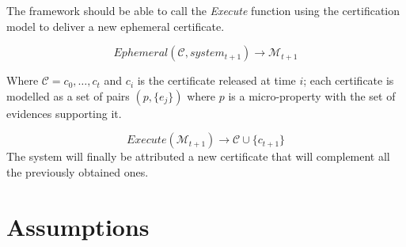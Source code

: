 The framework should be able to call the \textit{Execute} function using the certification model to deliver a new ephemeral certificate.

\[Ephemeral(\mathcal{C}, system_{t+1}) \rightarrow {\mathcal{M}}_{t+1} \]

Where \( \mathcal{C} = {c_0, \dots , c_t} \) and \(c_i\) is the certificate released at time \(i\); each certificate is modelled as a set of pairs \( (p, \{e_j\}) \) where \(p\) is a micro-property with the set of evidences supporting it.

\[ Execute(\mathcal{M}_{t+1}) \rightarrow \mathcal{C} \cup \{c_{t+1}\} \]
The system will finally be attributed a new certificate that will complement all the previously obtained ones.


\section{Assumptions}

